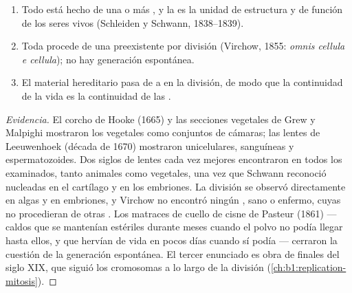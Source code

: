 \begin{proposition}\label{prop:b1:cell-unit-of-life:theory}
\begin{enumerate}
  \item Todo  está hecho de una o más , y la  es la
        unidad de estructura y de función de los seres vivos
        (Schleiden y Schwann, 1838--1839).
  \item Toda  procede de una  preexistente por división
        (Virchow, 1855: \emph{omnis cellula e cellula}); no hay
        generación espontánea.
  \item El material hereditario pasa de  a  en la división, de
        modo que la continuidad de la vida es la continuidad de las
        .
\end{enumerate}
\end{proposition}
\begin{proof}[Evidencia]
El corcho de Hooke (1665) y las secciones vegetales de Grew y Malpighi
mostraron los  vegetales como conjuntos de cámaras; las lentes de
Leeuwenhoek (década de 1670) mostraron  unicelulares, 
sanguíneas y espermatozoides. Dos siglos de lentes cada vez mejores
encontraron  en todos los  examinados, tanto animales como
vegetales, una vez que Schwann reconoció  nucleadas en el cartílago y
en los embriones. La división se observó directamente en algas y en
embriones, y Virchow no encontró ningún , sano o enfermo, cuyas
 no procedieran de otras . Los matraces de cuello de cisne de
Pasteur (1861) --- caldos que se mantenían estériles durante meses cuando el
polvo no podía llegar hasta ellos, y que hervían de vida en pocos días
cuando sí podía --- cerraron la cuestión de la generación espontánea. El
tercer enunciado es obra de finales del siglo XIX, que siguió los
cromosomas a lo largo de la división (\cref{ch:b1:replication-mitosis}).
\end{proof}

